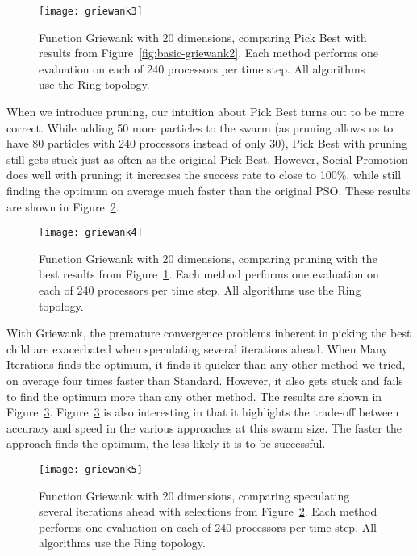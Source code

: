 \documentclass[smallcondensed]{svjour3}
\newcommand{\fig}[1]{Figure~\ref{fig:#1}}
\begin{document}
\begin{figure}
  \centering
  \texttt{[image: griewank3]}
  \caption{Function Griewank with 20 dimensions, comparing Pick Best with
  results from \fig{basic-griewank2}.  Each method performs one evaluation on
  each of 240 processors per time step.  All algorithms use the Ring topology.}
  \label{fig:griewank-pickbest}
\end{figure}

When we introduce pruning, our intuition about Pick Best turns out to be more
correct.  While adding 50 more particles to the swarm (as pruning allows us to
have 80 particles with 240 processors instead of only 30), Pick Best with
pruning still gets stuck just as often as the original Pick Best.  However,
Social Promotion does well with pruning; it increases the success rate to close
to 100\%, while still finding the optimum on average much faster than the
original PSO.  These results are shown in \fig{griewank-pruned}.

\begin{figure}
  \centering
  \texttt{[image: griewank4]}
  \caption{Function Griewank with 20 dimensions, comparing pruning with the
  best results from \fig{griewank-pickbest}.  Each method performs one
  evaluation on each of 240 processors per time step.  All algorithms use the
  Ring topology.}
  \label{fig:griewank-pruned}
\end{figure}

With Griewank, the premature convergence problems inherent in picking the best
child are exacerbated when speculating several iterations ahead.  When Many
Iterations finds the optimum, it finds it quicker than any other method we
tried, on average four times faster than Standard.  However, it also gets stuck
and fails to find the optimum more than any other method.  The results are
shown in \fig{griewank-manyiters}.   \fig{griewank-manyiters} is also
interesting in that it highlights the trade-off between accuracy and speed in
the various approaches at this swarm size.  The faster the approach finds the
optimum, the less likely it is to be successful.

\begin{figure}
  \centering
  \texttt{[image: griewank5]}
  \caption{Function Griewank with 20 dimensions, comparing speculating several
  iterations ahead with selections from \fig{griewank-pruned}.  Each method
  performs one evaluation on each of 240 processors per time step.  All
  algorithms use the Ring topology.}
  \label{fig:griewank-manyiters}
\end{figure}
\end{document}
